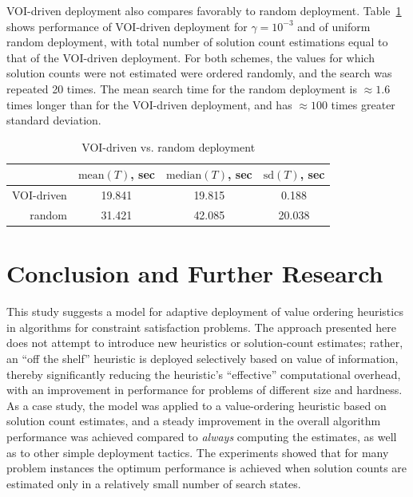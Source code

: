 VOI-driven deployment also compares favorably to
random deployment. Table~\ref{tbl:voirnd} shows
performance of VOI-driven deployment for $\gamma=10^{-3}$ and of
uniform random deployment, with total number of solution count estimations
equal to that of the VOI-driven deployment.
For both schemes, the values for which solution
counts were not estimated were ordered randomly, and the search
was repeated 20 times.  The mean search time for the random deployment is
$\approx1.6$ times longer than for the VOI-driven deployment, and has
$\approx100$ times greater standard deviation.
\begin{table}[h]
\begin{center}
\small
\begin{tabular}{r|c|c|c}
               & $\mathrm{mean}(T)$, sec & $\mathrm{median}(T)$, sec & $\mathrm{sd}(T)$, sec \\ \hline
VOI-driven     & 19.841                  & 19.815                    & 0.188 \\ \hline
random         & 31.421                  & 42.085                    & 20.038  
\end{tabular}
\end{center}
\caption{VOI-driven vs. random deployment}
\label{tbl:voirnd}
\end{table}

\section{Conclusion and Further Research}
\label{sec:csp-summary}

This study suggests a model for adaptive deployment of value ordering
heuristics in algorithms for constraint satisfaction problems. The
approach presented here does not attempt to introduce new
heuristics or solution-count estimates; rather, an ``off the shelf''
heuristic is deployed selectively based on value of information,
thereby significantly reducing the heuristic's ``effective''
computational overhead, with an improvement in performance for
problems of different size and hardness. As a case study, the model
was applied to a value-ordering heuristic based on solution count
estimates, and a steady improvement in the overall algorithm
performance was achieved compared to {\em always} computing the
estimates, as well as to other simple deployment tactics.  The
experiments showed that for many problem instances the optimum
performance is achieved when solution counts are estimated only in a
relatively small number of search states.

